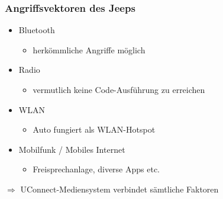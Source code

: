 \documentclass[t]{beamer}
\begin{document}
\begin{frame}
	\frametitle{Angriffsvektoren des Jeeps}
    \begin{itemize}
		\item Bluetooth
        \begin{itemize}
			\item herkömmliche Angriffe möglich
		\end{itemize}

    	\item Radio
        	\begin{itemize}
				\item vermutlich keine Code-Ausführung zu erreichen
			\end{itemize}

        \item WLAN
        	\begin{itemize}
				\item Auto fungiert als WLAN-Hotspot
			\end{itemize}

        \item Mobilfunk / Mobiles Internet
       		\begin{itemize}
				\item Freisprechanlage, diverse Apps etc.
			\end{itemize}
	\end{itemize}
    $\Rightarrow$ UConnect-Mediensystem verbindet sämtliche Faktoren
\end{frame}
\end{document}
